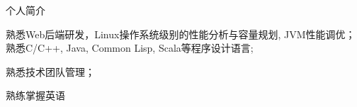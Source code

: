 \documentclass{resume} %
\begin{document}
\begin{rSection}{个人简介}
  \item 熟悉Web后端研发，Linux操作系统级别的性能分析与容量规划, JVM性能调优；熟悉C/C++, Java, Common Lisp, Scala等程序设计语言;
  \item 熟悉技术团队管理；
  \item 熟练掌握英语
\end{rSection}





\end{document}
